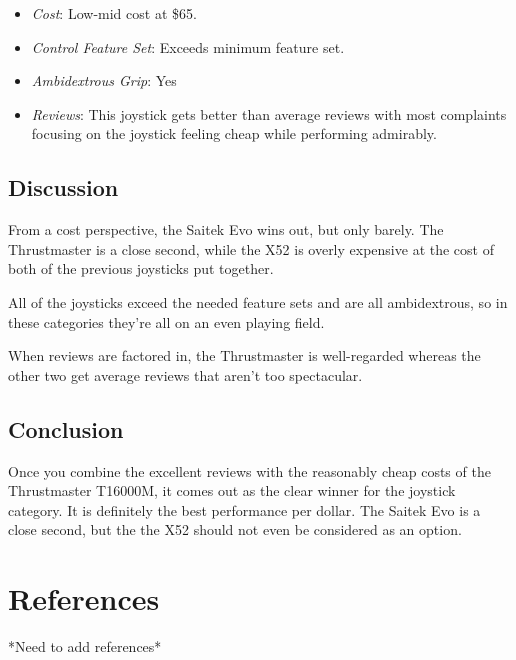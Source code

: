 \documentclass[onecolumn, draftclsnofoot, 10pt, compsoc]{IEEEtran}
\begin{document}
\begin{itemize}
\item \textit{Cost}: Low-mid cost at \$65.
\item \textit{Control Feature Set}: Exceeds minimum feature set.
\item \textit{Ambidextrous Grip}: Yes
\item \textit{Reviews}: This joystick gets better than average reviews with most complaints focusing on the joystick feeling cheap while performing admirably.
\end{itemize}

\subsection{Discussion}
From a cost perspective, the Saitek Evo wins out, but only barely. The Thrustmaster is a close second, while the X52 is overly expensive at the cost of both of the previous joysticks put together. 

All of the joysticks exceed the needed feature sets and are all ambidextrous, so in these categories they're all on an even playing field.

When reviews are factored in, the Thrustmaster is well-regarded whereas the other two get average reviews that aren't too spectacular.

\subsection{Conclusion}
Once you combine the excellent reviews with the reasonably cheap costs of the Thrustmaster T16000M, it comes out as the clear winner for the joystick category. It is definitely the best performance per dollar. The Saitek Evo is a close second, but the the X52 should not even be considered as an option.

\section{References}
*Need to add references*
\printbibliography[heading=none]
\end{document}

